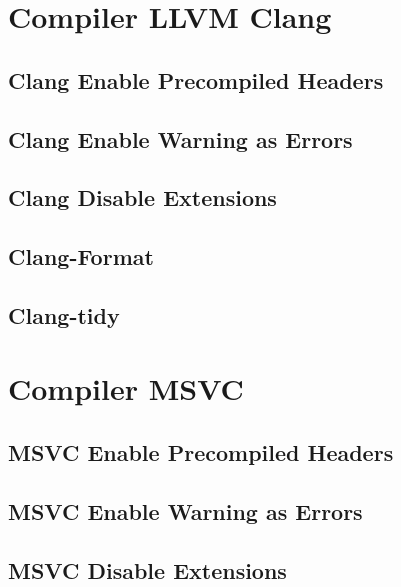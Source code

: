 \section{Compiler LLVM Clang}

\subsection{Clang Enable Precompiled Headers}
\subsection{Clang Enable Warning as Errors}
\subsection{Clang Disable Extensions}

\subsection{Clang-Format}

\subsection{Clang-tidy}


\section{Compiler MSVC}

\subsection{MSVC Enable Precompiled Headers}
\subsection{MSVC Enable Warning as Errors}
\subsection{MSVC Disable Extensions}

